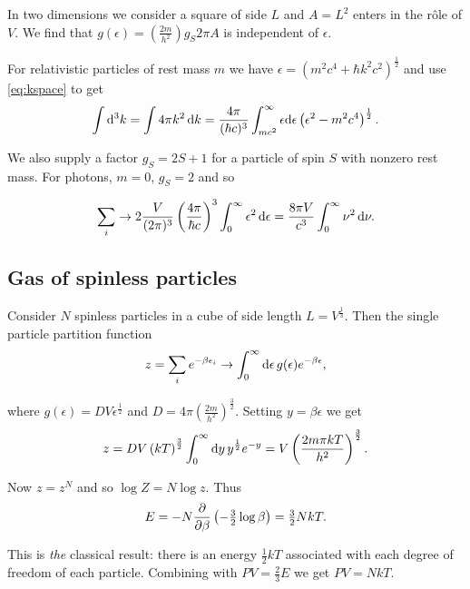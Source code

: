 \documentclass{notes}
\begin{document}
In two dimensions we consider a square of side $L$ and $A = L^2$ enters
in the r\^ole of $V$.  We find that $g(\epsilon) = \left( \frac{2 m}{h^2}
\right) g_S 2 \pi A$ is independent of $\epsilon$.

For relativistic particles of rest mass $m$ we have
$\epsilon = \left( m^2 c^4 + \hbar k^2 c^2 \right)^{\frac{1}{2}}$
and use \eqref{eq:kspace} to get
\begin{equation}\label{eq:relespace}
\int \mathrm{d}^3 k = \int 4 \pi k^2\, \mathrm{d} k = \frac{4 \pi}{(\hbar c)^3}
\int_{mc^2}^\infty \epsilon \mathrm{d} \epsilon \left( \epsilon^2 - m^2 c^4
\right)^{\frac{1}{2}}.
\end{equation}

We also supply a factor $g_S = 2 S + 1$ for a particle of spin $S$ with
nonzero rest mass.  For photons, $m=0$, $g_S = 2$ and so

\begin{equation}\label{eq:photspace}
\sum_i \to 2 \frac{V}{(2 \pi)^3} \left( \frac{4 \pi}{\hbar c}\right)^3
\int_0^\infty \epsilon^2\, \mathrm{d} \epsilon = \frac{8 \pi V}{c^3}
\int_0^\infty \nu^2\, \mathrm{d} \nu.
\end{equation}

\subsection{Gas of spinless particles}

Consider $N$ spinless particles in a cube of side length $L = V^{\frac{1}{3}}$.
Then the single particle partition function
\[
z = \sum_i e^{-\beta \epsilon_i} \to \int_0^\infty
\mathrm{d} \epsilon\, g(\epsilon) e^{-\beta \epsilon},
\]

where $g(\epsilon) = D V \epsilon^{\frac{1}{2}}$
and $D = 4 \pi \left(\tfrac{2 m}{h^2}\right)^{\frac{3}{2}}$.
Setting $y = \beta \epsilon$ we get
\begin{equation}\label{eq:spin0gas}
z = D V \left(k T\right)^{\frac{3}{2}}
\int_0^\infty \mathrm{d} y\, y^{\frac{1}{2}} e^{-y}
= V \left( \frac{2 m \pi k T}{h^2} \right)^{\frac{3}{2}}.
\end{equation}

Now $z = z^N$ and so $\log Z = N \log z$.  Thus
\[
E = -N \frac{\partial }{\partial \beta} \left(-\tfrac{3}{2} \log \beta\right)
= \tfrac{3}{2} N k T.
\]

This is \emph{the} classical result: there is an energy $\tfrac{1}{2} k T$
associated with each degree of freedom of each particle.  Combining
with $PV = \tfrac{2}{3} E$ we get $PV = N k T$.
\end{document}
